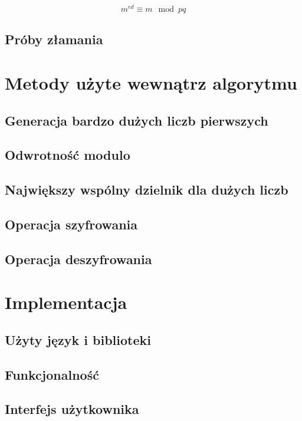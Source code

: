 \documentclass[10pt,a4paper]{article}
\begin{document}
\begin{equation}
m^{ed} \equiv m \mod pq
\end{equation}

\subsection{Próby złamania}

\section{Metody użyte wewnątrz algorytmu}
\subsection{Generacja bardzo dużych liczb pierwszych}
\subsection{Odwrotność modulo}
\subsection{Największy wspólny dzielnik dla dużych liczb}
\subsection{Operacja szyfrowania}
\subsection{Operacja deszyfrowania}

\section{Implementacja}
\subsection{Użyty język i biblioteki}
\subsection{Funkcjonalność}
\subsection{Interfejs użytkownika}


	
\end{document}
